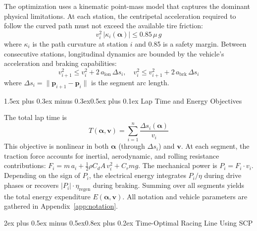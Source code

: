 \documentclass[conf]{new-aiaa}
\makeatletter
\renewcommand\section{\@startsection{section}{1}{\z@}%
  {2ex plus 0.5ex minus 0.5ex}{0.8ex plus 0.2ex}%
  {\normalfont\large\bfseries\centering}}
\renewcommand\subsection{\@startsection{subsection}{2}{\z@}%
  {1.5ex plus 0.3ex minus 0.3ex}{0.5ex plus 0.1ex}%
  {\normalfont\normalsize\bfseries}}
\makeatother
\begin{document}
The optimization uses a kinematic point-mass model that captures the dominant physical limitations.
At each station, the centripetal acceleration required to follow the curved path must not exceed
the available tire friction:
\begin{equation}\label{eq:cornering}
  v_i^2 \, |\kappa_i(\boldsymbol{\alpha})| \leq 0.85\,\mu \, g
\end{equation}
where $\kappa_i$ is the path curvature at station $i$ and 0.85 is a safety margin. Between consecutive stations, longitudinal dynamics are bounded by
the vehicle's acceleration and braking capabilities:
\begin{equation}\label{eq:accel}
  v_{i+1}^2 \leq v_i^2 + 2\,a_{\text{lon}}\,\Delta s_i, \quad
  v_i^2 \leq v_{i+1}^2 + 2\,a_{\text{brk}}\,\Delta s_i
\end{equation}
where $\Delta s_i = \|\mathbf{p}_{i+1} - \mathbf{p}_i\|$ is the segment arc length.

\subsection{Lap Time and Energy Objectives}

The total lap time is
\begin{equation}\label{eq:laptime}
  T(\boldsymbol{\alpha}, \mathbf{v}) = \sum_{i=1}^{n} \frac{\Delta s_i(\boldsymbol{\alpha})}{v_i}
\end{equation}
This objective is nonlinear in both $\boldsymbol{\alpha}$ (through $\Delta s_i$) and $\mathbf{v}$.
At each segment, the traction force accounts for inertial, aerodynamic, and rolling resistance
contributions: $F_i = m\,a_i + \tfrac{1}{2}\rho C_d A\,v_i^2 + C_r m g$. The mechanical power is
$P_i = F_i \cdot v_i$. Depending on the sign of $P_i$, the electrical energy integrates
$P_i / \eta$ during drive phases or recovers $|P_i| \cdot \eta_{\text{regen}}$ during braking.
Summing over all segments yields the total energy expenditure $E(\boldsymbol{\alpha}, \mathbf{v})$.
All notation and vehicle parameters are gathered in Appendix~\ref{app:notation}.

\section{Time-Optimal Racing Line Using SCP}
\end{document}

